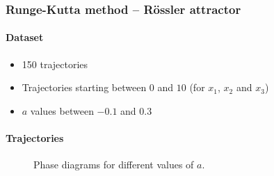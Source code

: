 \begin{frame}
	\frametitle{Runge-Kutta method -- R\"ossler attractor}
	\paragraph{Dataset}\vspace{-2mm}
	\begin{itemize}
		\item 150 trajectories
		\item Trajectories starting between $0$ and $10$ (for $x_1$, $x_2$ and $x_3$)
		\item $a$ values between $-0.1$ and $0.3$
	\end{itemize}
	\paragraph{Trajectories}\vspace{-2mm}
	\begin{figure}[H]
		\quad
		\caption{Phase diagrams for different values of $a$.}
	\end{figure}
\end{frame}

